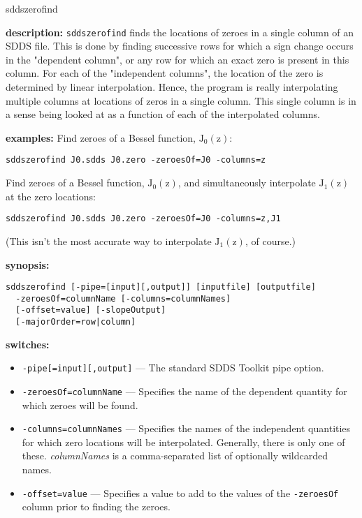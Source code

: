 \begin{sddsprog}{sddszerofind}
  \item \textbf{description:}
    \verb|sddszerofind| finds the locations of zeroes in a single column of an SDDS file. This is done by finding successive rows for which a sign change occurs in the "dependent column", or any row for which an exact zero is present in this column. For each of the "independent columns", the location of the zero is determined by linear interpolation. Hence, the program is really interpolating multiple columns at locations of zeros in a single column. This single column is in a sense being looked at as a function of each of the interpolated columns.
  \item \textbf{examples:}
    Find zeroes of a Bessel function, $\mathrm{J_0(z)}$:
    \begin{verbatim}
sddszerofind J0.sdds J0.zero -zeroesOf=J0 -columns=z
    \end{verbatim}
    Find zeroes of a Bessel function, $\mathrm{J_0(z)}$, and simultaneously interpolate $\mathrm{J_1(z)}$ at the zero locations:
    \begin{verbatim}
sddszerofind J0.sdds J0.zero -zeroesOf=J0 -columns=z,J1
    \end{verbatim}
    (This isn't the most accurate way to interpolate $\mathrm{J_1(z)}$, of course.)
  \item \textbf{synopsis:}
    \begin{verbatim}
sddszerofind [-pipe=[input][,output]] [inputfile] [outputfile]
  -zeroesOf=columnName [-columns=columnNames]
  [-offset=value] [-slopeOutput]
  [-majorOrder=row|column]
    \end{verbatim}
  \item \textbf{switches:}
    \begin{itemize}
      \item \verb|-pipe[=input][,output]| --- The standard SDDS Toolkit pipe option.
      \item \verb|-zeroesOf=columnName| --- Specifies the name of the dependent quantity for which zeroes will be found.
      \item \verb|-columns=columnNames| --- Specifies the names of the independent quantities for which zero locations will be interpolated. Generally, there is only one of these. \emph{columnNames} is a comma-separated list of optionally wildcarded names.
      \item \verb|-offset=value| --- Specifies a value to add to the values of the \verb|-zeroesOf| column prior to finding the zeroes.

\end{itemize}
\end{sddsprog}
